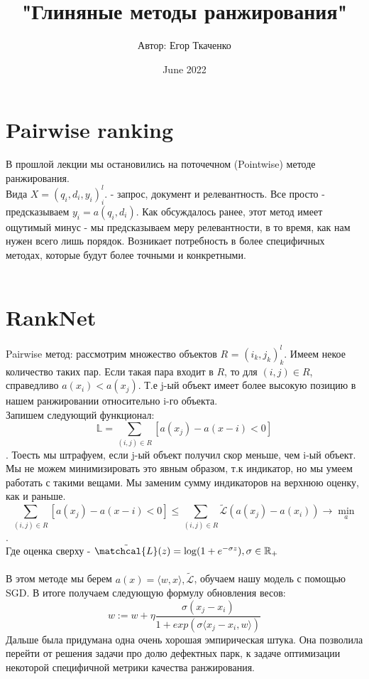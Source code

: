 \documentclass{article}
\title{"Глиняные методы ранжирования"}
\author{Автор: Егор Ткаченко}
\date{June 2022}
\begin{document}
\maketitle

\section{Pairwise ranking}
В прошлой лекции мы остановились на поточечном (Pointwise) методе ранжирования. \\ Вида $X = (q_i, d_i, y_i)_i^l$. - запрос, документ и релевантность. Все просто - предсказываем $y_i=a(q_i, d_i)$. Как обсуждалось ранее, этот метод имеет ощутимый минус - мы предсказываем меру релевантности, в то время, как нам нужен всего лишь порядок. Возникает потребность в более специфичных методах, которые будут более точными и конкретными.\\ \\

\section{RankNet}
Pairwise метод: рассмотрим множество объектов $R$ = $(i_k, j_k)_k^l$. Имеем некое количество таких пар. Если такая пара входит в $R$, то для $(i,j) \in R$, справедливо $a(x_i) < a(x_j)$. Т.е j-ый объект имеет более высокую позицию в нашем ранжировании относительно i-го объекта. \\
Запишем следующий функционал: $$\mathbb{L} = \sum\limits_{(i,j) \in R}{[a(x_j)-a(x-i) < 0]} $$. Тоесть мы штрафуем, если j-ый объект получил скор меньше, чем i-ый объект. \\
Мы не можем минимизировать это явным образом, т.к индикатор, но мы умеем работать с такими вещами. Мы заменим сумму индикаторов на верхнюю оценку, как и раньше.  \\
$$\sum\limits_{(i,j) \in R}{[a(x_j)-a(x-i) < 0]} \leqslant \sum\limits_{(i,j) \in R}{\tilde{\mathcal{L}}(a(x_j)-a(x_i))} \rightarrow \min_{a} $$. \\Где оценка сверху - 
$\tilde{\matchcal{L}}(z) = \log(1+e^{-\sigma z}), \sigma \in \mathbb{R}_{+}$  \\\\ В этом методе мы берем $a(x) = \langle w,x \rangle, \tilde{\mathcal{L}}$, обучаем нашу модель с помощью SGD. В итоге получаем следующую формулу обновления весов: \\
\[w := w + \eta \frac{\sigma(x_j-x_i) }{1 + exp(\sigma \langle x_j-x_i,w\rangle)} \] Дальше была придумана одна очень хорошая эмпирическая штука. Она позволила перейти от решения задачи про долю дефектных парк, к задаче  оптимизации некоторой специфичной метрики качества ранжирования. \\ \\
\end{document}
